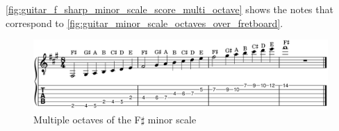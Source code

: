 \autoref{fig:guitar_f_sharp_minor_scale_score_multi_octave} shows the notes that correspond to \autoref{fig:guitar_minor_scale_octaves_over_fretboard}.

\begin{figure}[h]
	\centering
	\includegraphics[width=\textwidth]{../../MuseScore/Guitar/GuitarFSharpMinorMultiOctave.png}
	\caption{Multiple octaves of the F$\sharp$ minor scale}
	\label{fig:guitar_f_sharp_minor_scale_score_multi_octave}
\end{figure}

\newpage

